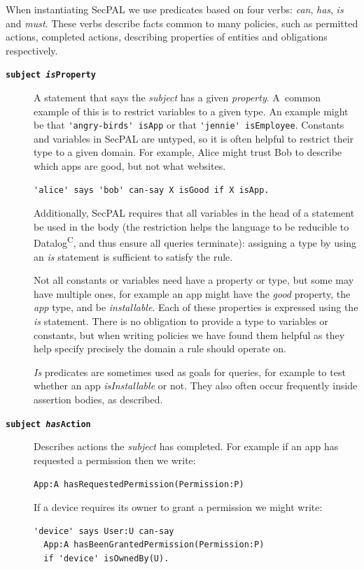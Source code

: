 \documentclass[thesis.tex]{subfiles}
\begin{document}
When instantiating SecPAL we use predicates based on four verbs:
\emph{can}, \emph{has}, \emph{is} and \emph{must}.  These verbs
describe facts common to many policies, such as permitted actions, completed actions, describing properties of entities and obligations respectively.  
\begin{description}
\item[\bfseries\texttt{subject \emph{is}Property}]
  A statement that says the \emph{subject} has a given \emph{property}.
  A~common example of this is to restrict variables to a given type.
  An example might be that \lstinline!'angry-birds' isApp! or that \lstinline!'jennie' isEmployee!.
  Constants and variables in SecPAL are untyped, so it is
  often helpful to restrict their type to a given domain.  For example, Alice
  might trust Bob to describe which apps are good, but not what websites.
  \begin{lstlisting}
'alice' says 'bob' can-say X isGood if X isApp.
  \end{lstlisting}
  Additionally, SecPAL requires that all variables in the head of a
  statement be used in the body (the restriction helps the language to
  be reducible to Datalog\textsuperscript{C}, and thus ensure all
  queries terminate): assigning a type by using an \emph{is} statement
  is sufficient to satisfy the rule.

  Not all constants or variables need have a property or type, but
  some may have multiple ones, for example an app might have the
  \emph{good} property, the \emph{app} type, and be \emph{installable}.
  Each of these properties is expressed using the \emph{is} statement.
  There is no obligation to provide a type to variables or constants,
  but when writing policies we have found them helpful as they help
  specify precisely the domain a rule should operate on.

  \emph{Is} predicates are sometimes used as goals for queries, for
  example to test whether an app \emph{isInstallable} or not.  They also
  often occur frequently inside assertion bodies, as described.

\item[\bfseries\texttt{subject \emph{has}Action}]
  Describes actions the \emph{subject} has completed.
  For example if an app has requested a permission then we write:

  \lstinline!App:A hasRequestedPermission(Permission:P)!

  If a device requires its owner to grant a permission we might write:
  \begin{lstlisting}
'device' says User:U can-say
  App:A hasBeenGrantedPermission(Permission:P)
  if 'device' isOwnedBy(U).
  \end{lstlisting}


\end{description}
\end{document}
